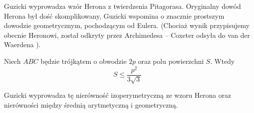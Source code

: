 %

Guzicki \cite[s. 165-168]{guzicki_2021} wyprowadza wzór Herona z twierdzenia Pitagorasa.
Oryginalny dowód Herona był dość skomplikowany, Guzicki \cite[s. 168-169]{guzicki_2021} wspomina o znacznie prostszym dowodzie geometrycznym, pochodzącym od Eulera.
%
(Chociaż wynik przypisujemy obecnie Heronowi, został odkryty przez Archimedesa -- Coxeter \cite[s. 12]{coxeter_1991} odsyła do van der Waerdena \cite{MISSING_CITATION}).

\begin{proposition}
	Niech $ABC$ będzie trójkątem o obwodzie $2p$ oraz polu powierzchni $S$.
	Wtedy
	\begin{equation}
		S \le \frac{p^2}{3 \sqrt{3}}
	\end{equation}
\end{proposition}

Guzicki wyprowadza tę nierówność izoperymetryczną ze wzoru Herona oraz nierówności między średnią arytmetyczną i geometryczną.




%